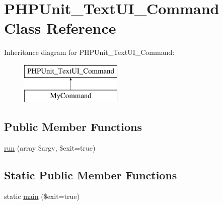 \hypertarget{class_p_h_p_unit___text_u_i___command}{}\section{P\+H\+P\+Unit\+\_\+\+Text\+U\+I\+\_\+\+Command Class Reference}
\label{class_p_h_p_unit___text_u_i___command}
Inheritance diagram for P\+H\+P\+Unit\+\_\+\+Text\+U\+I\+\_\+\+Command\+:\begin{figure}[H]
\begin{center}
\leavevmode
\includegraphics[height=2.000000cm]{class_p_h_p_unit___text_u_i___command}
\end{center}
\end{figure}
\subsection*{Public Member Functions}
\begin{DoxyCompactItemize}
\item 
\mbox{\hyperlink{class_p_h_p_unit___text_u_i___command_a2beab03aa97d08d7a25a709e018ecf8e}{run}} (array \$argv, \$exit=true)
\end{DoxyCompactItemize}
\subsection*{Static Public Member Functions}
\begin{DoxyCompactItemize}
\item 
static \mbox{\hyperlink{class_p_h_p_unit___text_u_i___command_aadc1fe8ec72bedafd51ee47cd16f8cba}{main}} (\$exit=true)
\end{DoxyCompactItemize}
